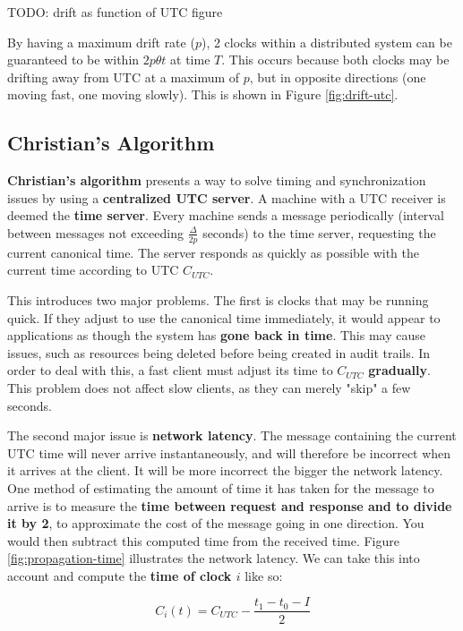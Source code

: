 \documentclass{article}
\begin{document}
TODO: drift as function of UTC figure

By having a maximum drift rate ($p$), 2 clocks within a distributed system can be guaranteed to be within $2p \theta t$ at time $T$. This occurs because both clocks may be drifting away from UTC at a maximum of $p$, but in opposite directions (one moving fast, one moving slowly). This is shown in Figure \ref{fig:drift-utc}.

\subsection{Christian's Algorithm}

\textbf{Christian's algorithm} presents a way to solve timing and synchronization issues by using a \textbf{centralized UTC server}. A machine with a UTC receiver is deemed the \textbf{time server}. Every machine sends a message periodically (interval between messages not exceeding $\frac{\Delta}{2p}$ seconds) to the time server, requesting the current canonical time. The server responds as quickly as possible with the current time according to UTC $C_{UTC}$. 

This introduces two major problems. The first is clocks that may be running quick. If they adjust to use the canonical time immediately, it would appear to applications as though the system has \textbf{gone back in time}. This may cause issues, such as resources being deleted before being created in audit trails. In order to deal with this, a fast client must adjust its time to $C_{UTC}$ \textbf{gradually}. This problem does not affect slow clients, as they can merely "skip" a few seconds. 

The second major issue is \textbf{network latency}. The message containing the current UTC time will never arrive instantaneously, and will therefore be incorrect when it arrives at the client. It will be more incorrect the bigger the network latency. One method of estimating the amount of time it has taken for the message to arrive is to measure the \textbf{time between request and response and to divide it by 2}, to approximate the cost of the message going in one direction. You would then subtract this computed time from the received time. Figure \ref{fig:propagation-time} illustrates the network latency. We can take this into account and compute the \textbf{time of clock $i$} like so:

\begin{equation}
	C_i(t) = C_{UTC} - \frac{t_1 - t_0 - I}{2}
\end{equation}
\end{document}
